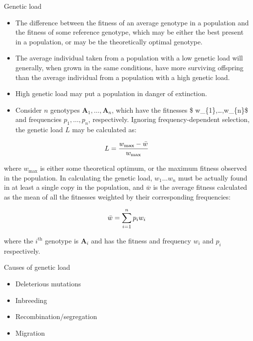 \documentclass[11pt,dvipsnames,ignorenonframetext,aspectratio=169]{beamer}
\providecommand{\tightlist}{%
  \setlength{\itemsep}{0pt}\setlength{\parskip}{0pt}}
\begin{document}
\begin{frame}{Genetic load}
\protect\hypertarget{genetic-load}{}
\footnotesize

\begin{itemize}
\tightlist
\item
  The difference between the fitness of an average genotype in a
  population and the fitness of some reference genotype, which may be
  either the best present in a population, or may be the theoretically
  optimal genotype.
\item
  The average individual taken from a population with a low genetic load
  will generally, when grown in the same conditions, have more surviving
  offspring than the average individual from a population with a high
  genetic load.
\item
  High genetic load may put a population in danger of extinction.
\item
  Consider \(n\) genotypes \(\mathbf{A}_{1},\dots ,\mathbf{A}_{n}\),
  which have the fitnesses \$ w\_\{1\},\dots ,w\_\{n\}\$ and frequencies
  \(p_{1},\dots, p_{n}\), respectively. Ignoring frequency-dependent
  selection, the genetic load \(L\) may be calculated as:
\end{itemize}

\[
\small
L={{w_{\max }-{\bar {w}}} \over w_{\max }}
\]
\end{frame}

\begin{frame}{}
\protect\hypertarget{section-29}{}
where \(w_{\max }\) is either some theoretical optimum, or the maximum
fitness observed in the population. In calculating the genetic load,
\(w_{1}\dots w_{n}\) must be actually found in at least a single copy in
the population, and \(\bar{w}\) is the average fitness calculated as the
mean of all the fitnesses weighted by their corresponding frequencies:

\[
\small
{\bar {w}}={\sum _{i=1}^{n}{p_{i}w_{i}}}
\]

where the \(i^\mathrm{th}\) genotype is \(\mathbf{A}_{i}\) and has the
fitness and frequency \(w_{i}\) and \(p_{i}\) respectively.
\end{frame}

\begin{frame}{Causes of genetic load}
\protect\hypertarget{causes-of-genetic-load}{}
\begin{itemize}
\tightlist
\item
  Deleterious mutations
\item
  Inbreeding
\item
  Recombination/segregation
\item
  Migration
\end{itemize}
\end{frame}
\end{document}
